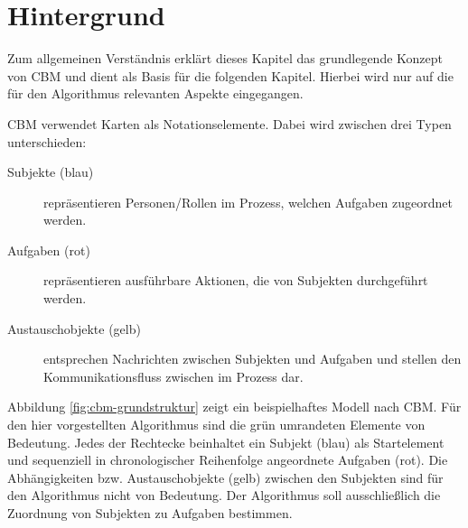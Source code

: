 %
%
% 
% 
% 

\chapter{Hintergrund} %
\label{cha:hintergrund}
Zum allgemeinen Verständnis erklärt dieses Kapitel das grundlegende Konzept von CBM und dient als Basis für die folgenden Kapitel. Hierbei wird nur auf die für den Algorithmus relevanten Aspekte eingegangen. 

CBM verwendet Karten als Notationselemente. Dabei wird zwischen drei Typen unterschieden:
\begin{description}
	\item[Subjekte (blau)] repräsentieren Personen/Rollen im Prozess, welchen Aufgaben zugeordnet werden.
	\item[Aufgaben (rot)] repräsentieren ausführbare Aktionen, die von Subjekten durchgeführt werden.
	\item[Austauschobjekte (gelb)] entsprechen Nachrichten zwischen Subjekten und Aufgaben und stellen den Kommunikationsfluss zwischen im Prozess dar.
\end{description}

Abbildung \ref{fig:cbm-grundstruktur} zeigt ein beispielhaftes Modell nach CBM. Für den hier vorgestellten Algorithmus sind die grün umrandeten Elemente von Bedeutung. Jedes der Rechtecke beinhaltet ein Subjekt (blau) als Startelement und sequenziell in chronologischer Reihenfolge angeordnete Aufgaben (rot). Die Abhängigkeiten bzw. Austauschobjekte (gelb) zwischen den Subjekten sind für den Algorithmus nicht von Bedeutung. Der Algorithmus soll ausschließlich die Zuordnung von Subjekten zu Aufgaben bestimmen.


